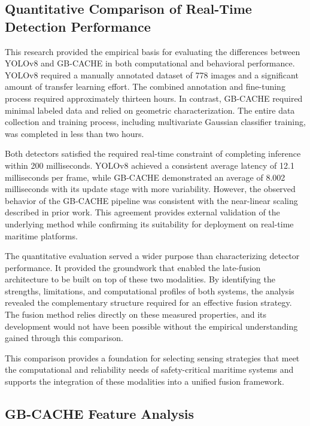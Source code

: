 \documentclass{erauthesis}
\begin{document}
\subsection{Quantitative Comparison of Real-Time Detection Performance}

This research provided the empirical basis for evaluating the differences between YOLOv8 and GB-CACHE in both computational and behavioral performance. YOLOv8 required a manually annotated dataset of 778 images and a significant amount of transfer learning effort. The combined annotation and fine-tuning process required approximately thirteen hours. In contrast, GB-CACHE required minimal labeled data and relied on geometric characterization. The entire data collection and training process, including multivariate Gaussian classifier training, was completed in less than two hours.

Both detectors satisfied the required real-time constraint of completing inference within 200 milliseconds. YOLOv8 achieved a consistent average latency of 12.1 milliseconds per frame, while GB-CACHE demonstrated an  average of 8.002 milliseconds with its update stage with more variability. However, the observed behavior of the GB-CACHE pipeline was consistent with the near-linear scaling described in prior work. This agreement provides external validation of the underlying method while confirming its suitability for deployment on real-time maritime platforms.

The quantitative evaluation served a wider purpose than characterizing detector performance. It provided the groundwork that enabled the late-fusion architecture to be built on top of these two modalities. By identifying the strengths, limitations, and computational profiles of both systems, the analysis revealed the complementary structure required for an effective fusion strategy. The fusion method relies directly on these measured properties, and its development would not have been possible without the empirical understanding gained through this comparison.

This comparison provides a foundation for selecting sensing strategies that meet the computational and reliability needs of safety-critical maritime systems and supports the integration of these modalities into a unified fusion framework.

\subsection{GB-CACHE Feature Analysis}
\end{document}
